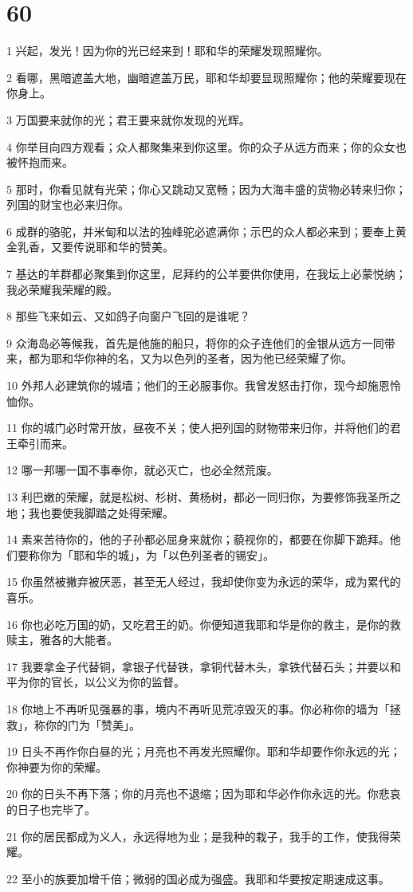 \chapter{60}

\par 1 兴起，发光！因为你的光已经来到！耶和华的荣耀发现照耀你。
\par 2 看哪，黑暗遮盖大地，幽暗遮盖万民，耶和华却要显现照耀你；他的荣耀要现在你身上。
\par 3 万国要来就你的光；君王要来就你发现的光辉。
\par 4 你举目向四方观看；众人都聚集来到你这里。你的众子从远方而来；你的众女也被怀抱而来。
\par 5 那时，你看见就有光荣；你心又跳动又宽畅；因为大海丰盛的货物必转来归你；列国的财宝也必来归你。
\par 6 成群的骆驼，并米甸和以法的独峰驼必遮满你；示巴的众人都必来到；要奉上黄金乳香，又要传说耶和华的赞美。
\par 7 基达的羊群都必聚集到你这里，尼拜约的公羊要供你使用，在我坛上必蒙悦纳；我必荣耀我荣耀的殿。
\par 8 那些飞来如云、又如鸽子向窗户飞回的是谁呢？
\par 9 众海岛必等候我，首先是他施的船只，将你的众子连他们的金银从远方一同带来，都为耶和华你神的名，又为以色列的圣者，因为他已经荣耀了你。
\par 10 外邦人必建筑你的城墙；他们的王必服事你。我曾发怒击打你，现今却施恩怜恤你。
\par 11 你的城门必时常开放，昼夜不关；使人把列国的财物带来归你，并将他们的君王牵引而来。
\par 12 哪一邦哪一国不事奉你，就必灭亡，也必全然荒废。
\par 13 利巴嫩的荣耀，就是松树、杉树、黄杨树，都必一同归你，为要修饰我圣所之地；我也要使我脚踏之处得荣耀。
\par 14 素来苦待你的，他的子孙都必屈身来就你；藐视你的，都要在你脚下跪拜。他们要称你为「耶和华的城」，为「以色列圣者的锡安」。
\par 15 你虽然被撇弃被厌恶，甚至无人经过，我却使你变为永远的荣华，成为累代的喜乐。
\par 16 你也必吃万国的奶，又吃君王的奶。你便知道我耶和华是你的救主，是你的救赎主，雅各的大能者。
\par 17 我要拿金子代替铜，拿银子代替铁，拿铜代替木头，拿铁代替石头；并要以和平为你的官长，以公义为你的监督。
\par 18 你地上不再听见强暴的事，境内不再听见荒凉毁灭的事。你必称你的墙为「拯救」，称你的门为「赞美」。
\par 19 日头不再作你白昼的光；月亮也不再发光照耀你。耶和华却要作你永远的光；你神要为你的荣耀。
\par 20 你的日头不再下落；你的月亮也不退缩；因为耶和华必作你永远的光。你悲哀的日子也完毕了。
\par 21 你的居民都成为义人，永远得地为业；是我种的栽子，我手的工作，使我得荣耀。
\par 22 至小的族要加增千倍；微弱的国必成为强盛。我耶和华要按定期速成这事。

